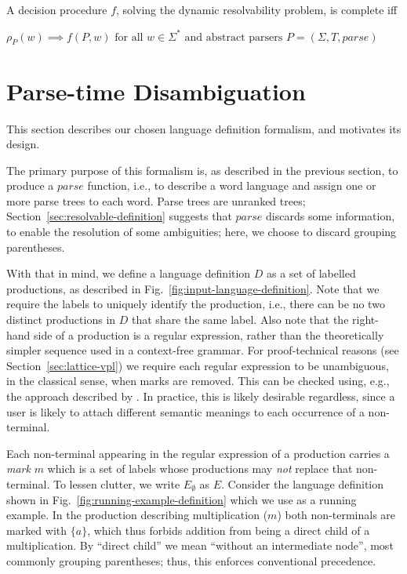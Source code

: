 \documentclass[acmsmall,review,anonymous]{acmart}\settopmatter{printfolios=true,printccs=false,printacmref=false}
\newcommand{\T}{\Sigma} %
\newcommand{\parse}{\mathit{parse}} %
\begin{document}
\begin{definition}\label{def:dynamic-procedure-complete}
  A decision procedure $f$, solving the dynamic resolvability problem, is complete iff

  $\rho_P(w) \implies f(P, w) \text{ for all } w \in \Sigma^{*} \text{ and abstract parsers } P = (\T, T, \parse)$
\end{definition}


\section{Parse-time Disambiguation} \label{sec:parse-time-disambiguation}

This section describes our chosen language definition formalism, and motivates its design.

The primary purpose of this formalism is, as described in the previous section, to produce a $\parse$ function, i.e., to describe a word language and assign one or more parse trees to each word. Parse trees are unranked trees; Section~\ref{sec:resolvable-definition} suggests that $\parse$ discards some information, to enable the resolution of some ambiguities; here, we choose to discard grouping parentheses.

With that in mind, we define a language definition $D$ as a set of labelled productions, as described in Fig.~\ref{fig:input-language-definition}. Note that we require the labels to uniquely identify the production, i.e., there can be no two distinct productions in $D$ that share the same label. Also note that the right-hand side of a production is a regular expression, rather than the theoretically simpler sequence used in a context-free grammar. For proof-technical reasons (see Section~\ref{sec:lattice-vpl}) we require each regular expression to be unambiguous, in the classical sense, when marks are removed. This can be checked using, e.g., the approach described by \citet{brabrandTypedUnambiguousPattern2010}. In practice, this is likely desirable regardless, since a user is likely to attach different semantic meanings to each occurrence of a non-terminal.

Each non-terminal appearing in the regular expression of a production carries a \emph{mark} $m$ which is a set of labels whose productions may \emph{not} replace that non-terminal. To lessen clutter, we write $E_\emptyset$ as $E$. Consider the language definition shown in Fig.~\ref{fig:running-example-definition} which we use as a running example. In the production describing multiplication ($m$) both non-terminals are marked with $\{a\}$, which thus forbids addition from being a direct child of a multiplication. By ``direct child'' we mean ``without an intermediate node'', most commonly grouping parentheses; thus, this enforces conventional precedence.
\end{document}
